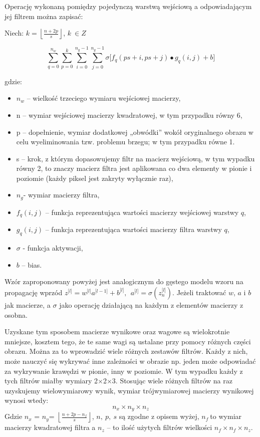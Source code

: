 Operację wykonaną pomiędzy pojedynczą warstwą wejściową a odpowiadającym jej filtrem można zapisać:

Niech: \(k = \left\lfloor \frac{n + 2p}{s} \right\rfloor\), \(k\ \in Z\)

\[\sum_{q = 0}^{n_{w}}{\sum_{p = 0}^{k}{\sum_{i = 0}^{n_{g} - 1}{\sum_{j = 0}^{n_{g} - 1}{\sigma\lbrack f_{q}\left( ps + i,ps + j \right) \bullet g_{q}\left( i,j \right) + b\rbrack}}}}\]

gdzie:

\begin{itemize}
\item
  \(n_{w}\) -- wielkość trzeciego wymiaru wejściowej macierzy,
\item
  n -- wymiar wejściowej macierzy kwadratowej, w tym przypadku równy 6,
\item
  p -- dopełnienie, wymiar dodatkowej „obwódki'' wokół oryginalnego
  obrazu w celu wyeliminowania tzw. problemu brzegu; w tym przypadku
  równe 1.
\item
  s -- krok, z którym dopasowujemy filtr na macierz wejściową, w tym
  wypadku równy 2, to znaczy macierz filtra jest aplikowana co dwa
  elementy w pionie i poziomie (każdy piksel jest zakryty wyłącznie
  raz),
\item
  \(n_{g}\)- wymiar macierzy filtra,
\item
  \(f_{q}(i,j)\) -- funkcja reprezentująca wartości macierzy wejściowej
  warstwy \(q\),
\item
  \(g_{q}(i,j)\) -- funkcja reprezentująca wartości macierzy filtra
  warstwy \(q\),
\item
  \(\sigma\) - funkcja aktywacji,
\item
  \(b\) -- bias.
\end{itemize}

Wzór zaproponowany powyżej jest analogicznym do gęstego modelu wzoru na
propagację wprzód \(z^{\lbrack l\rbrack} = w^{\lbrack l\rbrack}a^{\lbrack l - 1\rbrack} + b^{\lbrack l\rbrack},\ \ a^{\lbrack l\rbrack} = \sigma(z_{n}^{\lbrack l\rbrack})\). Jeżeli traktować \(w\), \(a\) i \(b\) jak macierze, a \(\sigma\) jako operację działającą na każdym z elementów macierzy z osobna.

Uzyskane tym sposobem macierze wynikowe oraz wagowe są wielokrotnie mniejsze, kosztem tego, że te same wagi są ustalane przy pomocy różnych części obrazu. Można za to wprowadzić wiele różnych zestawów filtrów. Każdy z nich, może nauczyć się wykrywać inne zależności w obrazie np. jeden może odpowiadać za wykrywanie krawędzi w pionie, inny w poziomie. W tym wypadku każdy z tych filtrów miałby wymiary 2\(\times\)2\(\times\)3. Stosując wiele różnych filtrów na raz uzyskujemy wielowymiarowy wynik,
wymiar trójwymiarowej macierzy wynikowej wynosi wtedy:
\[n_{x} \times n_{y} \times n_{z}\]
Gdzie \(n_{x}\) = ­­\(n_{y}\)=
\(\left\lfloor \frac{n + 2p - n_{f}}{s} \right\rfloor\), \(n,\ p,\ s\)
są zgodne z opisem wyżej, \(n_{f}\ \)to wymiar macierzy kwadratowej
filtra a \(n_{z}\) -- to ilość użytych filtrów wielkości
\(n_{f} \times n_{f} \times n_{z}\).

